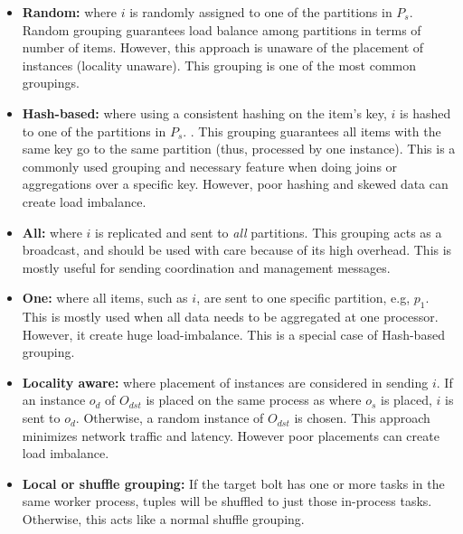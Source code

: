 \begin{itemize}
	\item \textbf{Random:} where $i$ is randomly assigned to one of the partitions in $P_s$. Random grouping guarantees load balance among partitions in terms of number of items. However, this approach is unaware of the placement of instances (locality unaware). This grouping is one of the most common groupings.
	\item \textbf{Hash-based:} where using a consistent hashing on the item's key, $i$ is hashed to one of the partitions in $P_s$. . This grouping guarantees all items with the same key go to the same partition (thus, processed by one instance). This is a commonly used grouping and necessary feature when doing joins or aggregations over a specific key. However, poor hashing and skewed data can create load imbalance.
	

	\item \textbf{All:} where $i$ is replicated and sent to \textit{all} partitions. This grouping acts as a broadcast, and should be used with care because of its high overhead. This is mostly useful for sending coordination and management messages.
	\item \textbf{One:} where all items, such as $i$,  are sent to one specific partition, e.g, $p_1$. This is mostly used when all data needs to be aggregated at one processor. However, it create huge load-imbalance. This is a special case of Hash-based grouping.
	\item \textbf{Locality aware:} where placement of instances are considered in sending $i$. If an instance $o_d$ of $O_{dst}$ is placed on the same process as where $o_s$ is placed, $i$ is sent to $o_d$. Otherwise, a random instance of $O_{dst}$ is chosen. This approach minimizes network traffic and latency. However poor placements can create load imbalance.


	
	\item \textbf{Local or shuffle grouping:}
	 If the target bolt has one or more tasks in the same worker process, tuples will be shuffled to just those in-process tasks. Otherwise, this acts like a normal shuffle grouping.
\end{itemize}

